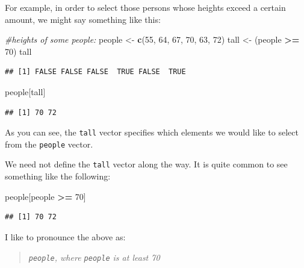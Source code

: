 \documentclass[]{book}
\makeatletter
\newenvironment{Shaded}{\begin{snugshade}}{\end{snugshade}}
\newcommand{\KeywordTok}[1]{\textcolor[rgb]{0.13,0.29,0.53}{\textbf{#1}}}
\newcommand{\DecValTok}[1]{\textcolor[rgb]{0.00,0.00,0.81}{#1}}
\newcommand{\StringTok}[1]{\textcolor[rgb]{0.31,0.60,0.02}{#1}}
\newcommand{\CommentTok}[1]{\textcolor[rgb]{0.56,0.35,0.01}{\textit{#1}}}
\newcommand{\OperatorTok}[1]{\textcolor[rgb]{0.81,0.36,0.00}{\textbf{#1}}}
\newcommand{\NormalTok}[1]{#1}
\newenvironment{kframe}{%
\medskip{}
\setlength{\fboxsep}{.8em}
 \def\at@end@of@kframe{}%
 \ifinner\ifhmode%
  \def\at@end@of@kframe{\end{minipage}}%
  \begin{minipage}{\columnwidth}%
 \fi\fi%
 \def\FrameCommand##1{\hskip\@totalleftmargin \hskip-\fboxsep
 \colorbox{shadecolor}{##1}\hskip-\fboxsep
     \hskip-\linewidth \hskip-\@totalleftmargin \hskip\columnwidth}%
 \MakeFramed {\advance\hsize-\width
   \@totalleftmargin\z@ \linewidth\hsize
   \@setminipage}}%
 {\par\unskip\endMakeFramed%
 \at@end@of@kframe}
\renewenvironment{Shaded}{\begin{kframe}}{\end{kframe}}
\theoremstyle{definition}
\theoremstyle{definition}
\theoremstyle{definition}
\theoremstyle{remark}
\makeatother
\begin{document}
For example, in order to select those persons whose heights exceed a
certain amount, we might say something like this:

\begin{Shaded}
\begin{Highlighting}[]
\CommentTok{#heights of some people:}
\NormalTok{people <-}\StringTok{ }\KeywordTok{c}\NormalTok{(}\DecValTok{55}\NormalTok{, }\DecValTok{64}\NormalTok{, }\DecValTok{67}\NormalTok{, }\DecValTok{70}\NormalTok{, }\DecValTok{63}\NormalTok{, }\DecValTok{72}\NormalTok{)}
\NormalTok{tall <-}\StringTok{ }\NormalTok{(people }\OperatorTok{>=}\StringTok{ }\DecValTok{70}\NormalTok{)}
\NormalTok{tall}
\end{Highlighting}
\end{Shaded}

\begin{verbatim}
## [1] FALSE FALSE FALSE  TRUE FALSE  TRUE
\end{verbatim}

\begin{Shaded}
\begin{Highlighting}[]
\NormalTok{people[tall]}
\end{Highlighting}
\end{Shaded}

\begin{verbatim}
## [1] 70 72
\end{verbatim}

As you can see, the \texttt{tall} vector specifies which elements we
would like to select from the \texttt{people} vector.

We need not define the \texttt{tall} vector along the way. It is quite
common to see something like the following:

\begin{Shaded}
\begin{Highlighting}[]
\NormalTok{people[people }\OperatorTok{>=}\StringTok{ }\DecValTok{70}\NormalTok{]}
\end{Highlighting}
\end{Shaded}

\begin{verbatim}
## [1] 70 72
\end{verbatim}

I like to pronounce the above as:

\begin{quote}
\emph{\texttt{people}, where \texttt{people} is at least 70}
\end{quote}
\end{document}
